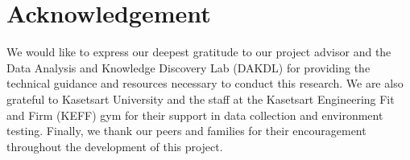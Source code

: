 \chapter*{Acknowledgement}
\label{chap:acknowledgement}

We would like to express our deepest gratitude to our project advisor and the Data Analysis 
and Knowledge Discovery Lab (DAKDL) for providing the technical guidance and resources necessary 
to conduct this research. We are also grateful to Kasetsart University and the staff at the 
Kasetsart Engineering Fit and Firm (KEFF) gym for their support in data collection and environment 
testing. Finally, we thank our peers and families for their encouragement throughout the development 
of this project.


\vspace{.2in}
\begin{flushright}
    \usevar{\srsAuthorOne} \\
    \usevar{\srsAuthorTwo} \\
    \usevar{\srsAuthorThree}
\end{flushright}